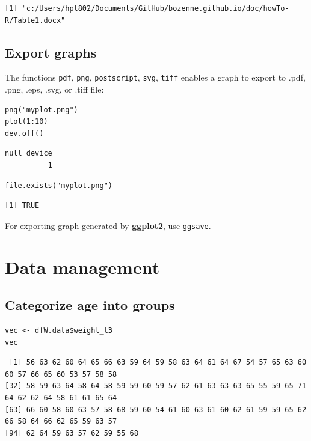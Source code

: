 \documentclass{article}
\begin{document}
\begin{verbatim}
[1] "c:/Users/hpl802/Documents/GitHub/bozenne.github.io/doc/howTo-R/Table1.docx"
\end{verbatim}

\subsection{Export graphs}
\label{sec:orge6e30b3}

The functions \texttt{pdf}, \texttt{png}, \texttt{postscript}, \texttt{svg}, \texttt{tiff} enables a graph to
export to .pdf, .png, .eps, .svg, or .tiff file:
\lstset{language=r,label= ,caption= ,captionpos=b,numbers=none}
\begin{lstlisting}
png("myplot.png")
plot(1:10)
dev.off()
\end{lstlisting}

\begin{verbatim}
null device 
          1
\end{verbatim}

\lstset{language=r,label= ,caption= ,captionpos=b,numbers=none}
\begin{lstlisting}
file.exists("myplot.png")
\end{lstlisting}

\begin{verbatim}
[1] TRUE
\end{verbatim}

For exporting graph generated by \textbf{ggplot2}, use \texttt{ggsave}.

\section{Data management}
\label{sec:org08340ab}
\subsection{Categorize age into groups}
\label{sec:orgbb32f83}
\lstset{language=r,label= ,caption= ,captionpos=b,numbers=none}
\begin{lstlisting}
vec <- dfW.data$weight_t3
vec
\end{lstlisting}

\begin{verbatim}
 [1] 56 63 62 60 64 65 66 63 59 64 59 58 63 64 61 64 67 54 57 65 63 60 60 57 66 65 60 53 57 58 58
[32] 58 59 63 64 58 64 58 59 59 60 59 57 62 61 63 63 63 65 55 59 65 71 64 62 62 64 58 61 61 65 64
[63] 66 60 58 60 63 57 58 68 59 60 54 61 60 63 61 60 62 61 59 59 65 62 66 58 64 66 62 65 59 63 57
[94] 62 64 59 63 57 62 59 55 68
\end{verbatim}
\end{document}
